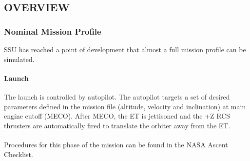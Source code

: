 \documentclass[13pt]{article}
\begin{document}
\subsection{OVERVIEW}
\begin{multicols*}{2}
\renewcommand{\cfttoctitlefont}{\bf}
\localtableofcontents

\subsubsection{Nominal Mission Profile}
SSU has reached a point of development that almost a full mission profile can be simulated.
\\
\paragraph{Launch}
The launch is controlled by autopilot. The autopilot targets a set of desired parameters defined in the mission file (altitude, velocity and inclination) at main engine cutoff (MECO).
After MECO, the ET is jettisoned and the +Z RCS thrusters are automatically fired to translate the orbiter away from the ET. \\
\\
Procedures for this phase of the mission can be found in the NASA Ascent Checklist.

\end{multicols*}
\end{document}
